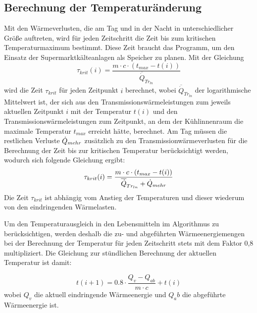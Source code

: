 \subsection{Berechnung der Temperaturänderung}
Mit den Wärmeverlusten, die am Tag und in der Nacht in unterschiedlicher Größe auftreten, wird für jeden Zeitschritt die Zeit
bis zum kritischen Temperaturmaximum bestimmt. Diese Zeit braucht das Programm, um den Einsatz der Supermarktkälteanlagen als
Speicher zu planen. Mit der Gleichung
\begin{equation}
	\tau_{krit}(i) = \frac{m \cdot c \cdot (t_{max} - t(i))}{\overline{\dot{Q}}_{Tr_{ln}}}
\label{taukn}
\end{equation}
wird die Zeit $\tau_{krit}$ für jeden Zeitpunkt $i$ berechnet, wobei $\overline{\dot{Q}}_{Tr_{ln}}$ der logarithmische Mittelwert
ist, der sich aus den Transmissionswärmeleistungen zum jeweils aktuellen Zeitpunkt $i$ mit der Temperatur $t(i)$ und den
Transmissionswärmeleistungen zum Zeitpunkt, an dem der Kühlinnenraum die maximale Temperatur $t_{max}$ erreicht hätte,
berechnet. Am Tag müssen die restlichen Verluste $\dot{Q}_{mehr}$ zusätzlich zu den Transmissionwärmeverlusten für die Berechnung der
Zeit bis zur kritischen Temperatur berücksichtigt werden, wodurch sich folgende Gleichung ergibt:
\begin{equation}
	\tau_{krit}(i) = \frac{m \cdot c \cdot (t_{max} - t(i))}{{\overline{\dot{Q}}_{Tr_{ln}}} + \pmehr}
\label{taukd}
\end{equation}
Die Zeit $\tau_{krit}$ ist abhängig vom Anstieg der Temperaturen und dieser wiederum von den eindringenden Wärmelasten.

Um den Temperaturausgleich in den Lebensmitteln im Algorithmus zu berücksichtigen, werden deshalb die zu- und abgeführten
Wärmeenergiemengen bei der Berechnung der Temperatur für jeden Zeitschritt stets mit dem Faktor 0,8 multipliziert.
Die Gleichung zur stündlichen Berechnung der aktuellen Temperatur ist damit:

\begin{equation}
	t(i+1) = 0.8 \cdot \frac{Q_v - Q_{ab}}{m \cdot c} + t(i)
\label{tns}
\end{equation}
wobei $Q_v$ die aktuell eindringende Wärmeenergie und $Q_ab$ die abgeführte Wärmeenergie ist.

